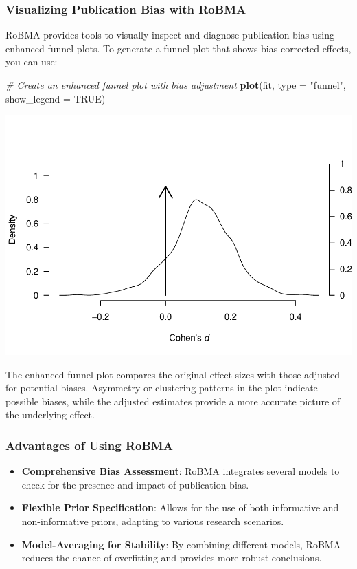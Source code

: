 \documentclass[
]{book}
\newenvironment{Shaded}{\begin{snugshade}}{\end{snugshade}}
\newcommand{\AttributeTok}[1]{\textcolor[rgb]{0.13,0.29,0.53}{#1}}
\newcommand{\CommentTok}[1]{\textcolor[rgb]{0.56,0.35,0.01}{\textit{#1}}}
\newcommand{\ConstantTok}[1]{\textcolor[rgb]{0.56,0.35,0.01}{#1}}
\newcommand{\FunctionTok}[1]{\textcolor[rgb]{0.13,0.29,0.53}{\textbf{#1}}}
\newcommand{\NormalTok}[1]{#1}
\newcommand{\StringTok}[1]{\textcolor[rgb]{0.31,0.60,0.02}{#1}}
\begin{document}
\subsubsection{Visualizing Publication Bias with RoBMA}\label{visualizing-publication-bias-with-robma}

RoBMA provides tools to visually inspect and diagnose publication bias using enhanced funnel plots. To generate a funnel plot that shows bias-corrected effects, you can use:

\begin{Shaded}
\begin{Highlighting}[]
\CommentTok{\# Create an enhanced funnel plot with bias adjustment}
\FunctionTok{plot}\NormalTok{(fit, }\AttributeTok{type =} \StringTok{"funnel"}\NormalTok{, }\AttributeTok{show\_legend =} \ConstantTok{TRUE}\NormalTok{)}
\end{Highlighting}
\end{Shaded}

\includegraphics{_main_files/figure-latex/unnamed-chunk-38-1.pdf}

The enhanced funnel plot compares the original effect sizes with those adjusted for potential biases. Asymmetry or clustering patterns in the plot indicate possible biases, while the adjusted estimates provide a more accurate picture of the underlying effect.

\subsubsection{Advantages of Using RoBMA}\label{advantages-of-using-robma}

\begin{itemize}
\item
  \textbf{Comprehensive Bias Assessment}: RoBMA integrates several models to check for the presence and impact of publication bias.
\item
  \textbf{Flexible Prior Specification}: Allows for the use of both informative and non-informative priors, adapting to various research scenarios.
\item
  \textbf{Model-Averaging for Stability}: By combining different models, RoBMA reduces the chance of overfitting and provides more robust conclusions.
\end{itemize}
\end{document}
